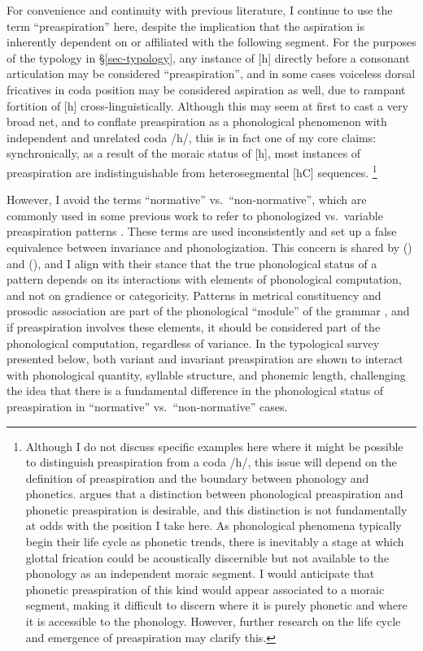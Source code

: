 \documentclass[output=paper,colorlinks,citecolor=brown]{langscibook}
\begin{document}
For convenience and continuity with previous literature, I continue to use the term ``preaspiration'' here, despite the implication that the aspiration is inherently dependent on or affiliated with the following segment. For the purposes of the typology in \S\ref{sec-typology}, any instance of [h] directly before a consonant articulation may be considered ``preaspiration'', and in some cases voiceless dorsal fricatives in coda position may be considered aspiration as well, due to rampant fortition of [h] cross-linguistically. Although this may seem at first to cast a very broad net, and to conflate preaspiration as a phonological phenomenon with independent and unrelated coda /h/, this is in fact one of my core claims: synchronically, as a result of the moraic status of [h], most instances of preaspiration are indistinguishable from heterosegmental [hC] sequences.%
\footnote{Although I do not discuss specific examples here where it might be possible to distinguish preaspiration from a coda /h/, this issue will depend on the definition of preaspiration and the boundary between phonology and phonetics.  argues that a distinction between phonological preaspiration and phonetic preaspiration is desirable, and this distinction is not fundamentally at odds with the position I take here. As phonological phenomena typically begin their life cycle as phonetic trends, there is inevitably a stage at which glottal frication could be acoustically discernible but not available to the phonology as an independent moraic segment. I would anticipate that phonetic preaspiration of this kind would appear associated to a moraic segment, making it difficult to discern where it is purely phonetic and where it is accessible to the phonology. However, further research on the life cycle and emergence of preaspiration may clarify this.}

However, I avoid the terms ``normative'' vs.\ ``non-normative'', which are commonly used in some previous work to refer to phonologized vs.\ variable preaspiration patterns \citep[e.g.,][]{Helgason2002,Clayton:2010,gordeevascobbie2007}. These terms are used inconsistently and set up a false equivalence between invariance and phonologization.
This concern is shared by \citeauthor{hejna2015} (\citeyear{hejna2015,hejna2019}) and \citeauthor{iosad2017-mfm} (\citeyear{iosad2017-mfm, chapters/02_Iosad}), and I align with their stance that the true phonological status of a pattern depends on its interactions with elements of phonological computation, and not on gradience or categoricity. Patterns in metrical constituency and prosodic association are part of the phonological ``module'' of the grammar \citep[e.g.,][]{bermudezotero2015}, and if preaspiration involves these elements, it should be considered part of the phonological computation, regardless of variance. In the typological survey presented below, both variant and invariant preaspiration are shown to interact with phonological quantity, syllable structure, and phonemic length, challenging the idea that there is a fundamental difference in the phonological status of preaspiration in ``normative'' vs.\ ``non-normative'' cases.
\end{document}
